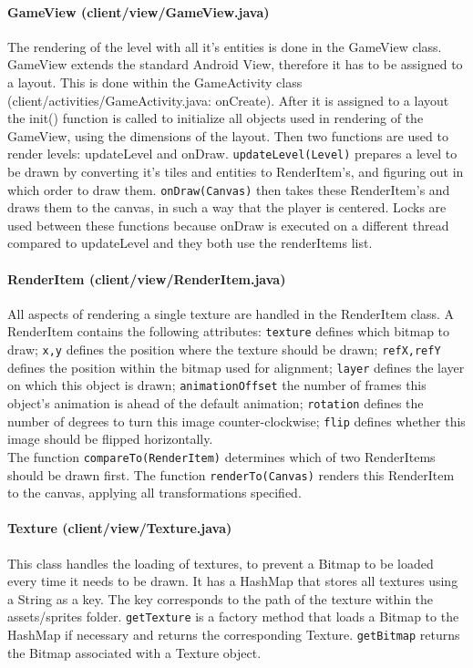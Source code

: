 \documentclass[../main.tex]{subfiles}
\begin{document}
        \paragraph{GameView (\tiny client/view/GameView.java\normalsize)}
        The rendering of the level with all it's entities is done in the GameView class. GameView extends the standard Android View, therefore it has to be assigned to a layout. This is done within the GameActivity class (\tiny client/activities/GameActivity.java: onCreate\normalsize). After it is assigned to a layout the init() function is called to initialize all objects used in rendering of the GameView, using the dimensions of the layout. Then two functions are used to render levels: updateLevel and onDraw. \texttt{updateLevel(Level)} prepares a level to be drawn by converting it's tiles and entities to RenderItem's, and figuring out in which order to draw them. \texttt{onDraw(Canvas)} then takes these RenderItem's and draws them to the canvas, in such a way that the player is centered. Locks are used between these functions because onDraw is executed on a different thread compared to updateLevel and they both use the renderItems list.

        \paragraph{RenderItem (\tiny client/view/RenderItem.java\normalsize)} All aspects of rendering a single texture are handled in the RenderItem class. A RenderItem contains the following attributes: \texttt{texture} defines which bitmap to draw; \texttt{x,y} defines the position where the texture should be drawn; \texttt{refX,refY} defines the position within the bitmap used for alignment; \texttt{layer} defines the layer on which this object is drawn; \texttt{animationOffset} the number of frames this object's animation is ahead of the default animation; \texttt{rotation} defines the number of degrees to turn this image counter-clockwise; \texttt{flip} defines whether this image should be flipped horizontally.\\
        The function \texttt{compareTo(RenderItem)} determines which of two RenderItems should be drawn first. The function \texttt{renderTo(Canvas)} renders this RenderItem to the canvas, applying all transformations specified.

        \paragraph{Texture (\tiny client/view/Texture.java\normalsize)} This class handles the loading of textures, to prevent a Bitmap to be loaded every time it needs to be drawn. It has a HashMap that stores all textures using a String as a key. The key corresponds to the path of the texture within the assets/sprites folder. \texttt{getTexture} is a factory method that loads a Bitmap to the HashMap if necessary and returns the corresponding Texture. \texttt{getBitmap} returns the Bitmap associated with a Texture object.
\end{document}
